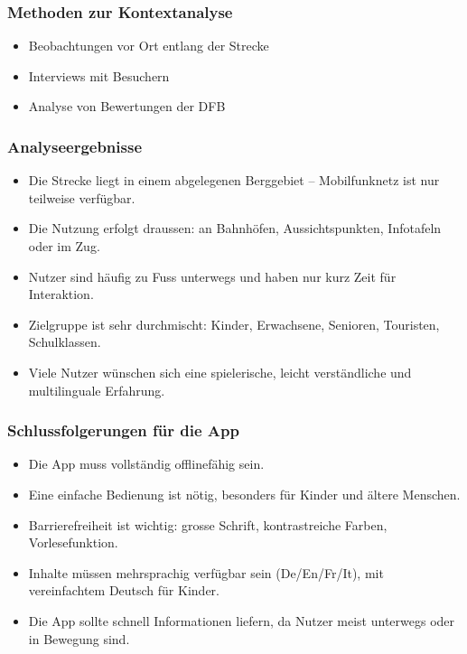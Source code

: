 \documentclass[10pt]{article}
\begin{document}
\subsubsection{Methoden zur Kontextanalyse}

\begin{itemize}
	\item Beobachtungen vor Ort entlang der Strecke
	\item Interviews mit Besuchern
	\item Analyse von Bewertungen der DFB
\end{itemize}

\subsubsection{Analyseergebnisse}
\begin{itemize}
	\item Die Strecke liegt in einem abgelegenen Berggebiet – Mobilfunknetz ist nur teilweise verfügbar.
	\item Die Nutzung erfolgt draussen: an Bahnhöfen, Aussichtspunkten, Infotafeln oder im Zug.
	\item Nutzer sind häufig zu Fuss unterwegs und haben nur kurz Zeit für Interaktion.
	\item Zielgruppe ist sehr durchmischt: Kinder, Erwachsene, Senioren, Touristen, Schulklassen.
	\item Viele Nutzer wünschen sich eine spielerische, leicht verständliche und multilinguale Erfahrung.
\end{itemize}

\subsubsection{Schlussfolgerungen für die App}
\begin{itemize}
	\item Die App muss vollständig offlinefähig sein.
	\item Eine einfache Bedienung ist nötig, besonders für Kinder und ältere Menschen.
	\item Barrierefreiheit ist wichtig: grosse Schrift, kontrastreiche Farben, Vorlesefunktion.
	\item Inhalte müssen mehrsprachig verfügbar sein (De/En/Fr/It), mit vereinfachtem Deutsch für Kinder.
	\item Die App sollte schnell Informationen liefern, da Nutzer meist unterwegs oder in Bewegung sind.
\end{itemize}
\pagebreak
\end{document}
